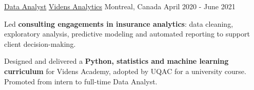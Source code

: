 \begin{cventries}
  \cventry
    {\href{https://www.videns.ai/}{Data Analyst}}
    {\href{https://www.videns.ai/}{Videns Analytics}}
    {Montreal, Canada}
    {April 2020 - June 2021}
    {
      \begin{cvitems}
        \item{Led \textbf{consulting engagements in insurance analytics}: data cleaning, exploratory analysis, predictive modeling and automated reporting to support client decision-making.}
        \item{Designed and delivered a \textbf{Python, statistics and machine learning curriculum} for Videns Academy, adopted by UQAC for a university course. Promoted from intern to full-time Data Analyst.}
      \end{cvitems}
    }
\end{cventries}
